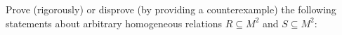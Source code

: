 \documentclass[a4paper,12pt]{article}
\begin{document}
\begin{tasks}
\begin{multicols}{2}
\begin{subtasks}








    \end{subtasks}
    \end{multicols}


    \item Prove (rigorously) or disprove (by providing a counterexample) the following statements about arbitrary homogeneous relations $R \subseteq M^2$ and $S \subseteq M^2$:


\end{tasks}
\end{document}
